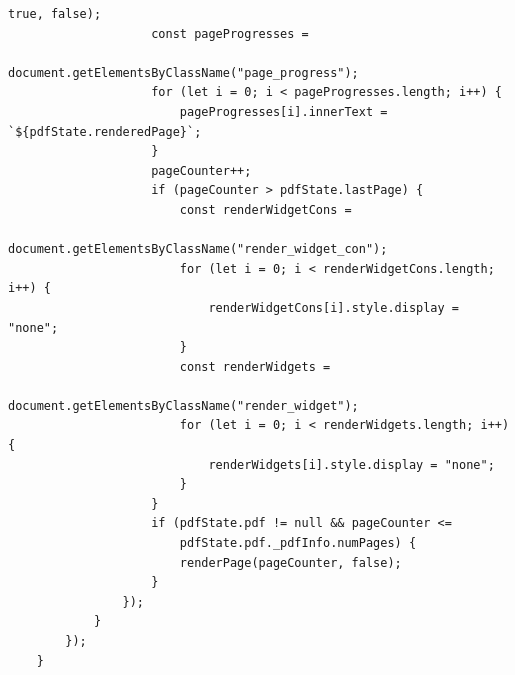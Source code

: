 \begin{lstlisting}[style=ES6, caption={Renderfunktion}, label=code:render]
						true, false);
					const pageProgresses = 
						document.getElementsByClassName("page_progress");
					for (let i = 0; i < pageProgresses.length; i++) {
						pageProgresses[i].innerText = `${pdfState.renderedPage}`;
					}
					pageCounter++;
					if (pageCounter > pdfState.lastPage) {
						const renderWidgetCons = 
							document.getElementsByClassName("render_widget_con");
						for (let i = 0; i < renderWidgetCons.length; i++) {
							renderWidgetCons[i].style.display = "none";
						}
						const renderWidgets = 
							document.getElementsByClassName("render_widget");
						for (let i = 0; i < renderWidgets.length; i++) {
							renderWidgets[i].style.display = "none";
						}
					} 
					if (pdfState.pdf != null && pageCounter <= 
						pdfState.pdf._pdfInfo.numPages) {
						renderPage(pageCounter, false);
					}
				});
			}
		});
	}
\end{lstlisting} 


